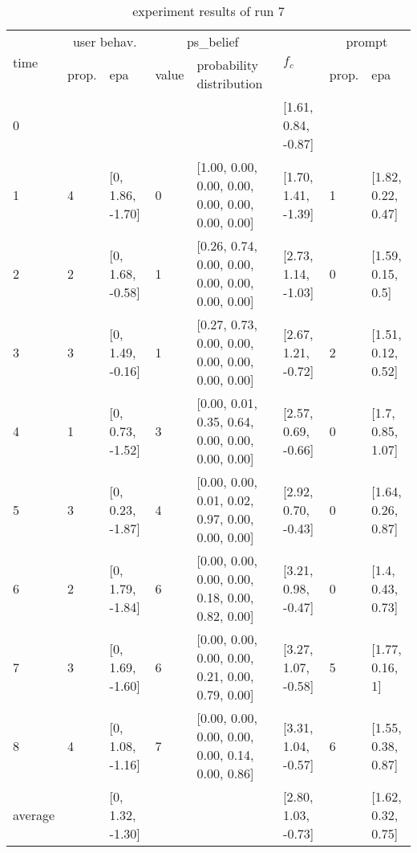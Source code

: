 \begin{table}[htbp]\footnotesize
\caption{experiment results of run 7}
\begin{tabular}{|p{0.4cm}|p{0.6cm}|l|p{0.6cm}|p{3.3cm}|l|p{0.6cm}|l|}
\hline

\multirow{2}{*}{time} & \multicolumn{2}{c|}{user behav.} & \multicolumn{2}{c|}{ps\_belief} &
\multirow{2}{*}{$f_c$} & \multicolumn{2}{c|}{prompt} \\ \cline{2-5}\cline{ 7- 8}
& prop. & epa & value & probability distribution &  & prop. & epa \\ \hline

0 & \multicolumn{1}{l|}{} &  & \multicolumn{1}{l|}{} &  & [1.61, 0.84, -0.87] & \multicolumn{1}{l|}{} &  \\ \hline
1 & 4 & [0, 1.86, -1.70] & 0 & [1.00, 0.00, 0.00, 0.00, 0.00, 0.00, 0.00, 0.00] & [1.70, 1.41, -1.39] & 1 & [1.82, 0.22, 0.47] \\ \hline
2 & 2 & [0, 1.68, -0.58] & 1 & [0.26, 0.74, 0.00, 0.00, 0.00, 0.00, 0.00, 0.00] & [2.73, 1.14, -1.03] & 0 & [1.59, 0.15, 0.5] \\ \hline
3 & 3 & [0, 1.49, -0.16] & 1 & [0.27, 0.73, 0.00, 0.00, 0.00, 0.00, 0.00, 0.00] & [2.67, 1.21, -0.72] & 2 & [1.51, 0.12, 0.52] \\ \hline
4 & 1 & [0, 0.73, -1.52] & 3 & [0.00, 0.01, 0.35, 0.64, 0.00, 0.00, 0.00, 0.00] & [2.57, 0.69, -0.66] & 0 & [1.7, 0.85, 1.07] \\ \hline
5 & 3 & [0, 0.23, -1.87] & 4 & [0.00, 0.00, 0.01, 0.02, 0.97, 0.00, 0.00, 0.00] & [2.92, 0.70, -0.43] & 0 & [1.64, 0.26, 0.87] \\ \hline
6 & 2 & [0, 1.79, -1.84] & 6 & [0.00, 0.00, 0.00, 0.00, 0.18, 0.00, 0.82, 0.00] & [3.21, 0.98, -0.47] & 0 & [1.4, 0.43, 0.73] \\ \hline
7 & 3 & [0, 1.69, -1.60] & 6 & [0.00, 0.00, 0.00, 0.00, 0.21, 0.00, 0.79, 0.00] & [3.27, 1.07, -0.58] & 5 & [1.77, 0.16, 1] \\ \hline
8 & 4 & [0, 1.08, -1.16] & 7 & [0.00, 0.00, 0.00, 0.00, 0.00, 0.14, 0.00, 0.86] & [3.31, 1.04, -0.57] & 6 & [1.55, 0.38, 0.87] \\ \hline
\multicolumn{1}{|l|}{average} & \multicolumn{1}{l|}{} & [0, 1.32, -1.30] & \multicolumn{1}{l|}{} &  & [2.80, 1.03, -0.73] & \multicolumn{1}{l|}{} & [1.62, 0.32, 0.75] \\ \hline
\end{tabular}
\label{}
\end{table}


